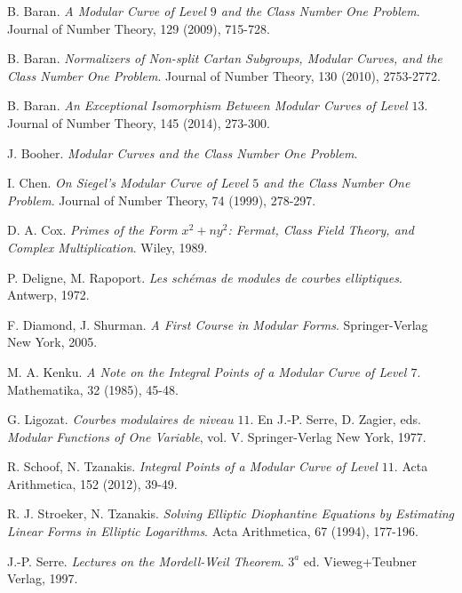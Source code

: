 \documentclass[a4paper,12pt]{article}
\begin{document}
\begin{thebibliography}{99}

  B. Baran. \emph{A Modular Curve of Level
 $9$ and the Class Number One Problem}. Journal of Number Theory,
 129 (2009), 715-728.

  B. Baran. \emph{Normalizers of
 Non-split Cartan Subgroups, Modular Curves, and the Class Number
 One Problem}. Journal of Number Theory, 130 (2010), 2753-2772.

  B. Baran. \emph{An Exceptional
 Isomorphism Between Modular Curves of Level $13$}. Journal of Number
 Theory, 145 (2014), 273-300.

  J. Booher. \emph{Modular Curves and the Class
 Number One Problem}.

  I. Chen. \emph{On Siegel's Modular Curve
 of Level $5$ and the Class Number One Problem}. Journal of
 Number Theory, 74 (1999), 278-297.

  D. A. Cox. \emph{Primes of the Form $x^{2}+ny^{2}$:
 Fermat, Class Field Theory, and Complex Multiplication}. Wiley, 1989.

  P. Deligne, M. Rapoport. \emph{Les sch\'{e}mas
 de modules de courbes elliptiques}. Antwerp, 1972.

  F. Diamond, J. Shurman. \emph{A
 First Course in Modular Forms}. Springer-Verlag New York, 2005.

  M. A. Kenku. \emph{A Note on the Integral
 Points of a Modular Curve of Level $7$}. Mathematika, 32 (1985),
 45-48.

  G. Ligozat. \emph{Courbes modulaires de niveau $11$}.
 En J.-P. Serre, D. Zagier, eds. \emph{Modular Functions of One Variable},
 vol. V. Springer-Verlag New York, 1977.

  R. Schoof, N. Tzanakis.
 \emph{Integral Points of a Modular Curve of Level $11$}. Acta
 Arithmetica, 152 (2012), 39-49.

  R. J. Stroeker, N. Tzanakis.
 \emph{Solving Elliptic Diophantine Equations by Estimating Linear Forms
 in Elliptic Logarithms}. Acta Arithmetica, 67 (1994), 177-196.

  J.-P. Serre. \emph{Lectures on the
 Mordell-Weil Theorem}. $3^{a}$ ed. Vieweg+Teubner Verlag, 1997.

\end{thebibliography}
\end{document}
